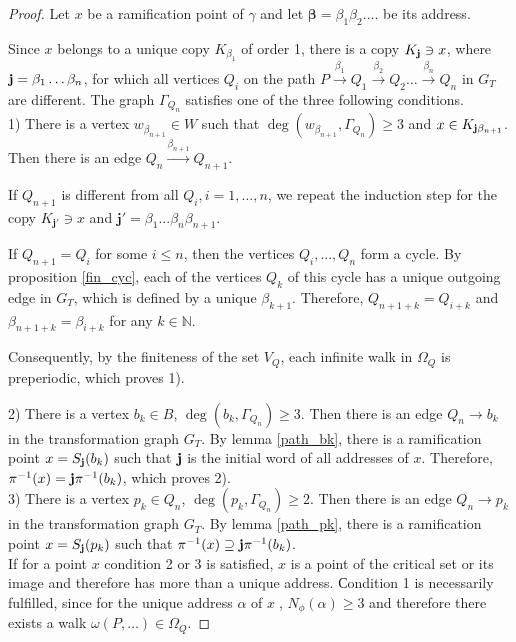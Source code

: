 \documentclass[11pt,reqno]{amsart}
\newcommand{\bmb}{{\bm \beta}}
\newcommand{\bj}{{\bm j}}
\begin{document}
\begin{proof}  Let $x$ be a ramification point of $\hat\gamma$ and let $\bmb={\beta_1\beta_2....}$ be its address.

Since $x$ belongs to a unique copy $K_{\beta_1}$ of order 1,   there is a copy $K_{\bf j} \ni x$, where ${\bf j} ={\beta_1\hdots \beta_n}$, for which all vertices $Q_i$ on the path 
     $P \overset{\beta_1}{\to} Q_{1} \overset{\beta_2}{\to} Q_{2}  \dots  \overset{\beta_n}{\to} Q_{n}$ in $G_T$    are different. The graph $\Gamma_{Q_n}$ satisfies one of the three following conditions.\\

     1)  There is a vertex $w_{\beta_{n+1}} \in W$ such that $\deg(w_{\beta_{n+1}},\Gamma_{Q_n})\ge 3$ and $x \in K_{{\bf j}\beta_{n+1}}$. Then there is an edge $Q_n\overset{\beta_{n+1}}{\to}Q_{{n+1}}$.
     
      If $Q_{n+1}$ is different from all $Q_i,i=1,...,n$, we repeat the induction step for the copy $K_{\bj'}\ni x$ and $\bj'=\beta_1...\beta_n \beta_{n+1}$.

     If $Q_{n+1}=Q_i$ for some $i\le n$, then the vertices $Q_i,...,Q_n$ form a cycle.  By proposition \ref{fin_cyc}, each of the vertices $Q_k$ of this cycle has a unique outgoing edge in $G_T$, which is defined by a unique $\beta_{k+1}$.    Therefore,
     $Q_{n+1+k}=Q_{i+k}$  and  $\beta_{n+1+k}=\beta_ {i+k}$ for any $k \in\mathbb{N}$.

     Consequently, by the finiteness of the set $V_Q$, each infinite walk in $\Omega_Q$ is preperiodic, which proves 1).
    
    2) There is a vertex $b_k \in B$, $\deg(b_k, \Gamma_{Q_{n}}) \ge 3$. Then there is an edge $Q_{n} \to b_k$ in the transformation graph $G_T$.
By  lemma \ref{path_bk}, there is a ramification point $x = S_{{\bf j}}(b_k)$ such that ${\bf j}$ is the initial word of all addresses of $x$. Therefore, $\pi^{-1}(x) = {\bf j}\pi^{-1}(b_k)$, which proves 2). \\

 3) There is a vertex $p_k \in Q_{n}$, $\deg(p_k, \Gamma_{Q_{n}}) \ge 2$. Then there is an edge $Q_{n} \to p_k$ in the transformation graph $G_T$. By  lemma \ref{path_pk}, there is a ramification point $x = S_{{\bf j}}(p_k)$ such that $\pi^{-1}(x) \supseteq {\bf j}\pi^{-1}(b_k)$.\\

 


If for a point $x$ condition 2 or 3  is satisfied, $x$ is a point of the critical set or its image and therefore has more than a  unique address. Сondition 1 is necessarily fulfilled, since for the unique address $\alpha$ of $x\;$, $N_{\phi}(\alpha) \geq 3$ and therefore there exists a walk $\omega(P,\dots) \in \Omega_Q$.


\end{proof}
\end{document}
